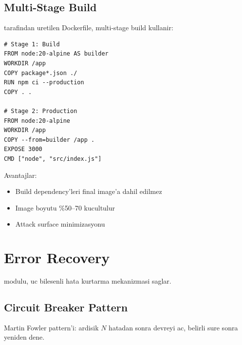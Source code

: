 \subsection{Multi-Stage Build}

 tarafindan uretilen Dockerfile, multi-stage
build kullanir:

\begin{lstlisting}[language={}, caption={Otomatik uretilen multi-stage Dockerfile}]
# Stage 1: Build
FROM node:20-alpine AS builder
WORKDIR /app
COPY package*.json ./
RUN npm ci --production
COPY . .

# Stage 2: Production
FROM node:20-alpine
WORKDIR /app
COPY --from=builder /app .
EXPOSE 3000
CMD ["node", "src/index.js"]
\end{lstlisting}

Avantajlar:
\begin{itemize}
  \item Build dependency'leri final image'a dahil edilmez
  \item Image boyutu \%50--70 kucultulur
  \item Attack surface minimizasyonu
\end{itemize}


\section{Error Recovery}
\label{sec:error-recovery}

 modulu, uc bilesenli hata kurtarma mekanizmasi saglar.

\subsection{Circuit Breaker Pattern}

Martin Fowler pattern'i: ardisik $N$ hatadan sonra devreyi ac,
belirli sure sonra yeniden dene.

